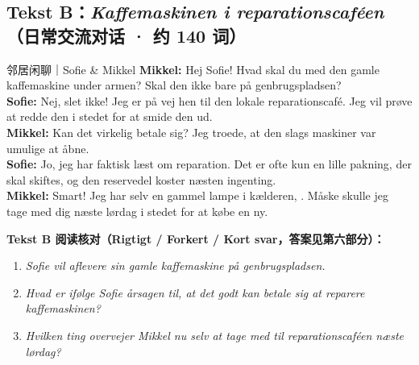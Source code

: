 \subsection*{Tekst B：\textit{Kaffemaskinen i reparationscaféen}（日常交流对话 · 约 140 词）}

\begin{emailbox}{邻居闲聊｜Sofie \& Mikkel}
\textbf{Mikkel:} Hej Sofie! Hvad skal du med den gamle kaffemaskine under armen? Skal den ikke bare på genbrugspladsen?\\
\textbf{Sofie:} Nej, slet ikke! Jeg er på vej hen til den lokale reparationscafé. Jeg vil prøve at redde den i stedet for at smide den ud.\\
\textbf{Mikkel:} Kan det virkelig betale sig? Jeg troede, at den slags maskiner var umulige at åbne.\\
\textbf{Sofie:} Jo, jeg har faktisk læst  om reparation. Det er ofte kun en lille pakning, der skal skiftes, og den reservedel koster næsten ingenting.\\
\textbf{Mikkel:} Smart! Jeg har selv en gammel lampe i kælderen, . Måske skulle jeg tage med dig næste lørdag i stedet for at købe en ny.
\end{emailbox}

\textbf{Tekst B 阅读核对（Rigtigt / Forkert / Kort svar，答案见第六部分）：}
\begin{enumerate}
  \item \textit{Sofie vil aflevere sin gamle kaffemaskine på genbrugspladsen.} \underline{\hspace{2.2cm}}
  \item \textit{Hvad er ifølge Sofie årsagen til, at det godt kan betale sig at reparere kaffemaskinen?} \underline{\hspace{2.2cm}}
  \item \textit{Hvilken ting overvejer Mikkel nu selv at tage med til reparationscaféen næste lørdag?} \underline{\hspace{2.2cm}}
\end{enumerate}

